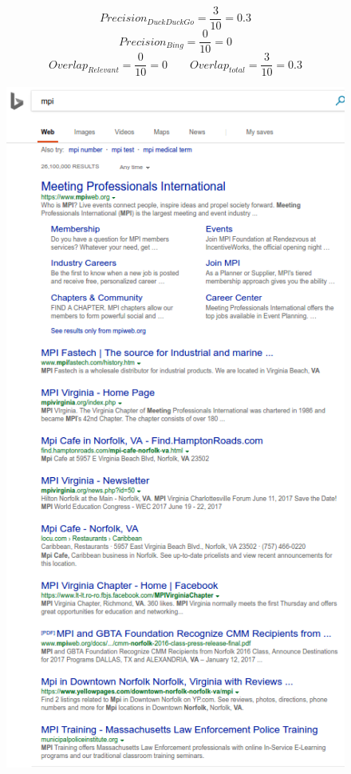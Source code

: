 \documentclass{article}
\begin{document}
$$Precision_{DuckDuckGo}=\frac{3}{10}=0.3$$
$$Precision_{Bing}=\frac{0}{10}=0$$
$$Overlap_{Relevant} =\frac{0}{10}=0 \qquad Overlap_{total} =\frac{3}{10}=0.3$$
\begin{figure}
	\includegraphics[scale=0.5]{bing_mpi.png}

\end{figure}
\end{document}
